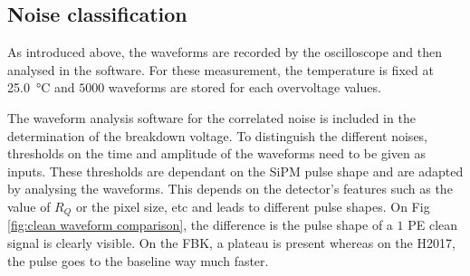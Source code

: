 \subsection{Noise classification}
\label{ch:Experimental methods:Noise identification}
As introduced above, the waveforms are recorded by the oscilloscope and then analysed in the software. For these measurement, the temperature is fixed at \SI{25.0}{\celsius} and $5000$ waveforms are stored for each overvoltage values.

The waveform analysis software for the correlated noise is included in the determination of the breakdown voltage. To distinguish the different noises, thresholds on the time and amplitude of the waveforms need to be given as inputs. These thresholds are dependant on the SiPM pulse shape and are adapted by analysing the waveforms. This depends on the detector's features such as the value of $R_Q$ or the pixel size, etc and leads to different pulse shapes. On Fig \ref{fig:clean waveform comparison}, the difference is the pulse shape of a $1$ \ac{PE} clean signal is clearly visible. On the FBK, a plateau is present whereas on the H2017, the pulse goes to the baseline way much faster. 
